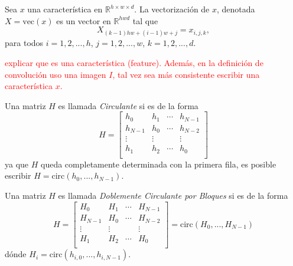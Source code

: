    \begin{definition}
        Sea $x$ una característica en $\mathbb R^{h\times w\times d}$. La vectorización de $x$, denotada $X = \text{vec}(x)$ es un vector en $\mathbb R^{hwd}$ tal que 
        \begin{equation}
            X_{(k-1)hw + (i-1)w + j} = x_{i,j,k},
        \end{equation}
        para todos $i=1,2, ..., h$, $j = 1, 2, ..., w$, $k= 1,2,..., d$.
    \end{definition}
    \textcolor{red}{explicar que es una característica (feature). Además, en la definición de convolución uso una imagen $I$, tal vez sea más consistente escribir una característica $x$.}
    \begin{definition}
        Una matriz $H$ es llamada \textsl{Circulante} si es de la forma
        \begin{equation}
            H = \begin{bmatrix}
                h_0 & h_1 & \cdots & h_{N-1} \\
                h_{N-1} & h_0 & \cdots & h_{N-2} \\
                \vdots & \vdots &  & \vdots \\
                h_1 & h_2 & \cdots & h_{0} \\
            \end{bmatrix}
        \end{equation}
        ya que $H$ queda completamente determinada con la primera fila, es posible escribir $H = \text{circ}(h_0, ..., h_{N-1})$.
    \end{definition} 
    \begin{definition}
        \label{doubly_circulant_matrix}
        Una matriz $H$ es llamada \textsl{Doblemente Circulante por Bloques} si es de la forma
        \begin{equation}
            H = \begin{bmatrix}
                H_0 & H_1 & \cdots & H_{N-1} \\
                H_{N-1} & H_0 & \cdots & H_{N-2} \\
                \vdots & \vdots &  & \vdots \\
                H_1 & H_2 & \cdots & H_{0} \\
            \end{bmatrix} = \text{circ}(H_0, ..., H_{N-1})
        \end{equation}
        dónde $H_i = \text{circ}(h_{i,0}, ..., h_{i, N-1})$.
    \end{definition}

